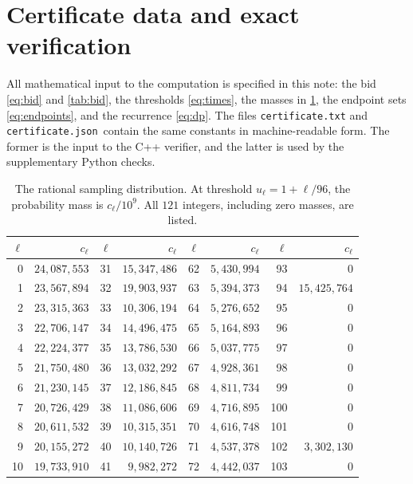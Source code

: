 \documentclass[11pt]{article}
\theoremstyle{definition}
\theoremstyle{remark}
\newcommand{\certfile}{\texttt{certificate.json}}
\begin{document}
\clearpage
\appendix
\section{Certificate data and exact verification}\label{app:verification}

All mathematical input to the computation is specified in this note:
the bid \eqref{eq:bid} and \cref{tab:bid}, the thresholds
\eqref{eq:times}, the masses in \cref{tab:masses}, the endpoint sets
\eqref{eq:endpoints}, and the recurrence \eqref{eq:dp}.
The files \texttt{certificate.txt} and \certfile\ contain the same
constants in machine-readable form. The former is the input to the C++
verifier, and the latter is used by the supplementary Python checks.

\begin{table}[H]
\centering
\caption{The rational sampling distribution. At threshold
$u_\ell=1+\ell/96$, the probability mass is $c_\ell/10^9$.
All $121$ integers, including zero masses, are listed.}
\label{tab:masses}
\small
\renewcommand{\arraystretch}{1.08}
\setlength{\tabcolsep}{7pt}
\begin{tabular}{rr@{\qquad}rr@{\qquad}rr@{\qquad}rr}
\toprule
$\ell$ & $c_\ell$ & $\ell$ & $c_\ell$ & $\ell$ & $c_\ell$ & $\ell$ & $c_\ell$\\
\midrule
0 & $24{,}087{,}553$ & 31 & $15{,}347{,}486$ & 62 & $5{,}430{,}994$ & 93 & $0$\\
1 & $23{,}567{,}894$ & 32 & $19{,}903{,}937$ & 63 & $5{,}394{,}373$ & 94 & $15{,}425{,}764$\\
2 & $23{,}315{,}363$ & 33 & $10{,}306{,}194$ & 64 & $5{,}276{,}652$ & 95 & $0$\\
3 & $22{,}706{,}147$ & 34 & $14{,}496{,}475$ & 65 & $5{,}164{,}893$ & 96 & $0$\\
4 & $22{,}224{,}377$ & 35 & $13{,}786{,}530$ & 66 & $5{,}037{,}775$ & 97 & $0$\\
5 & $21{,}750{,}480$ & 36 & $13{,}032{,}292$ & 67 & $4{,}928{,}361$ & 98 & $0$\\
6 & $21{,}230{,}145$ & 37 & $12{,}186{,}845$ & 68 & $4{,}811{,}734$ & 99 & $0$\\
7 & $20{,}726{,}429$ & 38 & $11{,}086{,}606$ & 69 & $4{,}716{,}895$ & 100 & $0$\\
8 & $20{,}611{,}532$ & 39 & $10{,}315{,}351$ & 70 & $4{,}616{,}748$ & 101 & $0$\\
9 & $20{,}155{,}272$ & 40 & $10{,}140{,}726$ & 71 & $4{,}537{,}378$ & 102 & $3{,}302{,}130$\\
10 & $19{,}733{,}910$ & 41 & $9{,}982{,}272$ & 72 & $4{,}442{,}037$ & 103 & $0$\\

\end{tabular}
\end{table}
\end{document}
